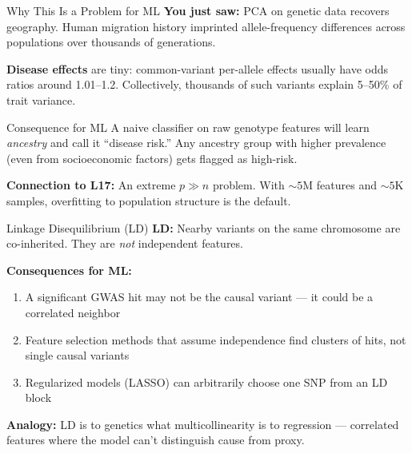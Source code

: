 \documentclass[aspectratio=169,10pt]{beamer}
\begin{document}
\begin{frame}{Why This Is a Problem for ML}
\textbf{You just saw:} PCA on genetic data recovers geography. Human migration history imprinted allele-frequency differences across populations over thousands of generations.

\vspace{0.3em}
\textbf{Disease effects} are tiny: common-variant per-allele effects usually have odds ratios around 1.01--1.2. Collectively, thousands of such variants explain 5--50\% of trait variance.

\vspace{0.3em}
\begin{block}{Consequence for ML}
A naive classifier on raw genotype features will learn \emph{ancestry} and call it ``disease risk.'' Any ancestry group with higher prevalence (even from socioeconomic factors) gets flagged as high-risk.
\end{block}

\vspace{0.2em}
\textbf{Connection to L17:} An extreme $p \gg n$ problem. With ${\sim}5$M features and ${\sim}5$K samples, overfitting to population structure is the default.
\end{frame}

\begin{frame}{Linkage Disequilibrium (LD)}
\textbf{LD:} Nearby variants on the same chromosome are co-inherited. They are \emph{not} independent features.

\vspace{0.3em}
\textbf{Consequences for ML:}
\begin{enumerate}[<+->]
    \item A significant GWAS hit may not be the causal variant --- it could be a correlated neighbor
    \item Feature selection methods that assume independence find clusters of hits, not single causal variants
    \item Regularized models (LASSO) can arbitrarily choose one SNP from an LD block
\end{enumerate}

\vspace{0.3em}
\textbf{Analogy:} LD is to genetics what multicollinearity is to regression --- correlated features where the model can't distinguish cause from proxy.
\end{frame}
\end{document}
